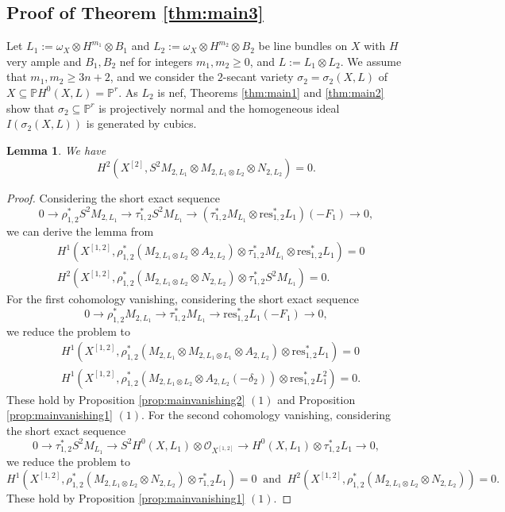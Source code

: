\documentclass{amsart}
\theoremstyle{plain}
\newtheorem{lem}[thm]{Lemma}
\theoremstyle{definition}
\theoremstyle{remark}
\newcommand{\res}{\textrm{res}}
\begin{document}
\subsection{Proof of Theorem \ref{thm:main3}}
Let $L_1:=\omega_X \otimes H^{m_1} \otimes B_1$ and $L_2:=\omega_X \otimes H^{m_2} \otimes B_2$ be line bundles on $X$ with $H$ very ample and $B_1, B_2$ nef for integers $m_1, m_2 \geq 0$, and $L:=L_1 \otimes L_2$. We assume that $m_1, m_2 \geq 3n+2$, and we consider the $2$-secant variety $\sigma_2=\sigma_2(X, L)$ of $X \subseteq \mathbb{P} H^0(X, L) = \mathbb{P}^r$. 
As $L_2$ is nef, Theorems \ref{thm:main1} and \ref{thm:main2} show that $\sigma_2 \subseteq \mathbb{P}^r$ is projectively normal and the homogeneous ideal $I(\sigma_2(X, L))$ is generated by cubics. 


\begin{lem}\label{lem:maintechnical3}
We have
$$
H^2(X^{[2]}, S^2 M_{2, L_1} \otimes M_{2, L_1 \otimes L_2} \otimes N_{2, L_2})=0.
$$
\end{lem}

\begin{proof}
Considering the short exact sequence
$$
0 \longrightarrow \rho_{1,2}^* S^2 M_{2, L_1} \longrightarrow \tau_{1,2}^* S^2 M_{L_1} \longrightarrow (\tau_{1,2}^* M_{L_1} \otimes \res_{1,2}^* L_1)(-F_1) \longrightarrow 0,
$$
we can derive the lemma from 
\begin{align*}
& H^1(X^{[1,2]}, \rho_{1,2}^* (M_{2, L_1 \otimes L_2} \otimes A_{2, L_2}) \otimes  \tau_{1,2}^* M_{L_1} \otimes \res_{1,2}^* L_1) = 0\\
& H^2(X^{[1,2]}, \rho_{1,2}^* (M_{2, L_1 \otimes L_2} \otimes N_{2, L_2}) \otimes \tau_{1,2}^* S^2 M_{L_1} )=0.
\end{align*}
For the first cohomology vanishing, considering the short exact sequence
$$
0 \longrightarrow \rho_{1,2}^* M_{2, L_1} \longrightarrow \tau_{1,2}^* M_{L_1} \longrightarrow \res_{1,2}^* L_1(-F_1) \longrightarrow 0, 
$$
we reduce the problem to 
\begin{align*}
& H^1 (X^{[1,2]}, \rho_{1,2}^* (M_{2, L_1} \otimes M_{2, L_1 \otimes L_1} \otimes A_{2,L_2}) \otimes \res_{1,2}^* L_1)=0\\
& H^1(X^{[1,2]}, \rho_{1,2}^* (M_{2, L_1 \otimes L_2} \otimes A_{2, L_2}(-\delta_2)) \otimes \res_{1,2}^*L_1^2)=0.
\end{align*}
These hold by Proposition \ref{prop:mainvanishing2} $(1)$ and Proposition \ref{prop:mainvanishing1} $(1)$. 
For the second cohomology vanishing, considering the short exact sequence
$$
0 \longrightarrow \tau_{1,2}^* S^2 M_{L_1} \longrightarrow S^2 H^0(X, L_1) \otimes \mathcal{O}_{X^{[1,2]}} \longrightarrow H^0(X, L_1) \otimes \tau_{1,2}^* L_1 \longrightarrow 0, 
$$
we reduce the problem to 
$$
H^1(X^{[1,2]}, \rho_{1,2}^* (M_{2, L_1 \otimes L_2} \otimes N_{2, L_2}) \otimes \tau_{1,2}^* L_1)=0
~\text{ and }~
H^2(X^{[1,2]}, \rho_{1,2}^*(M_{2, L_1 \otimes L_2} \otimes N_{2, L_2}))=0.
$$
These hold by Proposition \ref{prop:mainvanishing1} $(1)$.
\end{proof}
\end{document}
